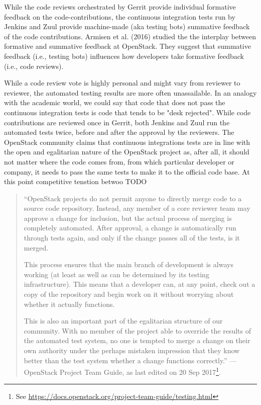 \documentclass[dvipsnames]{interact}
\theoremstyle{plain}\newtheorem{theorem}{Theorem}[section]
\theoremstyle{definition}
\theoremstyle{remark}
\newenvironment{newStuff}{
    \begin{color}{Sepia}
    \begin{tabular}{|p{1.0\textwidth}|}
    \hline\\
    }
    { 
    \\\\\hline
    \end{tabular} 
    \end{color}
    }
\renewenvironment{newStuff}{}{}
\begin{document}
\begin{newStuff}
While the code reviews orchestrated by Gerrit provide individual formative feedback on the code-contributions, the continuous integration tests run by Jenkins  and Zuul provide machine-made (aka testing bots) summative feedback of the code contributions. Armisen et al. (2016) \citep{armisen2016formative} studied the the interplay between formative and summative feedback at OpenStack. They suggest that summative feedback (i.e., testing bots) influences how developers take formative feedback (i.e., code reviews). 

While a code review vote is highly personal and might vary from reviewer to reviewer, the automated testing results are more often unassailable. In an analogy with the academic world, we could say that code that does not pass the continuous integration tests is code that tends to be "desk rejected". While code contributions are reviewed once in Gerrit, both Jenkins and Zuul run the automated tests twice, before and after the approval by the reviewers.  The OpenStack community claims that continuous integrations tests are in line with the open and egalitarian nature of the OpenStack project as, after all, it should not matter where the code comes from, from which particular developer or company, it  needs to pass the same tests to make it to the official code base. At this point competitive tenstion betwoo TODO 

\begin{quotation} 
\footnotesize

``OpenStack projects do not permit anyone to directly merge code to a source code repository. Instead, any member of a core reviewer team may approve a change for inclusion, but the actual process of merging is completely automated. After approval, a change is automatically run through tests again, and only if the change passes all of the tests, is it merged.

This process ensures that the main branch of development is always working (at least as well as can be determined by its testing infrastructure). This means that a developer can, at any point, check out a copy of the repository and begin work on it without worrying about whether it actually functions.

This is also an important part of the egalitarian structure of our community. With no member of the project able to override the results of the automated test system, no one is tempted to merge a change on their own authority under the perhaps mistaken impression that they know better than the test system whether a change functions correctly.''
--- OpenStack Project Team Guide, as last edited on 20 Sep 2017\footnote{See \url{https://docs.openstack.org/project-team-guide/testing.html}}.


\end{quotation}
\end{newStuff}
\end{document}
